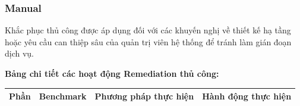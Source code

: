 \subsubsection{Manual}\label{trien-khai-remediate-manual}

Khắc phục thủ công được áp dụng đối với các khuyến nghị về thiết kế hạ tầng hoặc yêu cầu can thiệp sâu của quản trị viên hệ thống để tránh làm gián đoạn dịch vụ.

\textbf{Bảng chi tiết các hoạt động Remediation thủ công:}

{\def\LTcaptype{none} %
\begin{longtable}[]{@{}|
  >{\raggedright\arraybackslash}p{}|
  >{\raggedright\arraybackslash}p{}|
  >{\raggedright\arraybackslash}p{}|
  >{\raggedright\arraybackslash}p{}|@{}}
\hline
\begin{minipage}[b]{\linewidth}\raggedright
\textbf{Phần}
\end{minipage} & \begin{minipage}[b]{\linewidth}\raggedright
\textbf{Benchmark}
\end{minipage} & \begin{minipage}[b]{\linewidth}\raggedright
\textbf{Phương pháp thực hiện}
\end{minipage} & \begin{minipage}[b]{\linewidth}\raggedright
\textbf{Hành động thực hiện}
\end{minipage} \\
\hline
\endhead


\end{longtable}}

